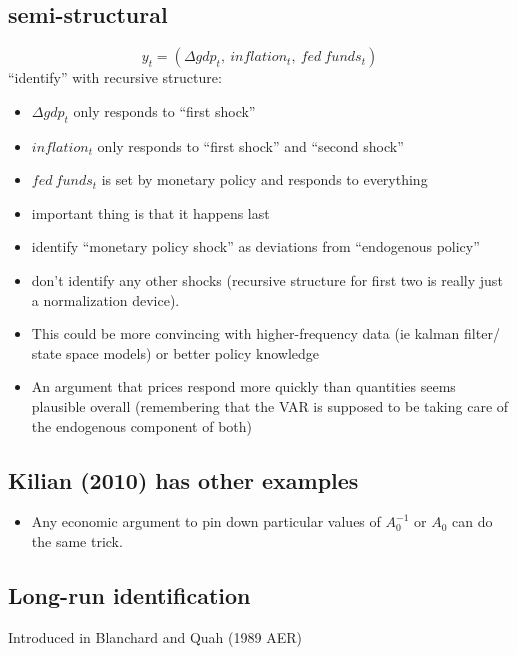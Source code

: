 \subsection{semi-structural}
\[y_t = (Δ gdp_t,\ inflation_t,\ fed\ funds_t)\]
``identify'' with recursive structure: 
\begin{itemize}
\item $Δ gdp_t$ only responds to
``first shock''
\item $inflation_t$ only responds to ``first shock'' and
``second shock''
\item $fed\ funds_t$ is set by monetary policy and responds
to everything
\item important thing is that it happens last
\item identify ``monetary policy shock'' as deviations from
  ``endogenous policy''
\item don't identify any other shocks (recursive structure for first
  two is really just a normalization device).
\end{itemize}

\begin{itemize}
\item This could be more convincing with higher-frequency data (ie
  kalman filter/ state space models) or better policy knowledge
\item An argument that prices respond more quickly than quantities
  seems plausible overall (remembering that the VAR is supposed to be
  taking care of the endogenous component of both)
\end{itemize}

\subsection{Kilian (2010) has other examples}

\begin{itemize}
\item Any economic argument to pin down particular values of
  $A_0^{-1}$ or $A_0$ can do the same trick.
\end{itemize}

\subsection{Long-run identification}

Introduced in Blanchard and Quah (1989 AER)

